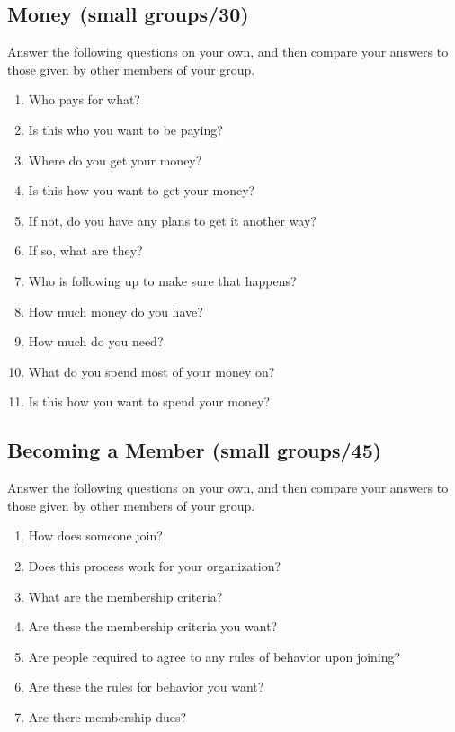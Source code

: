\subsection*{Money (small groups/30)}

Answer the following questions on your own, and then compare your
answers to those given by other members of your group.

\begin{enumerate}
\item
  Who pays for what?
\item
  Is this who you want to be paying?
\item
  Where do you get your money?
\item
  Is this how you want to get your money?
\item
  If not, do you have any plans to get it another way?
\item
  If so, what are they?
\item
  Who is following up to make sure that happens?
\item
  How much money do you have?
\item
  How much do you need?
\item
  What do you spend most of your money on?
\item
  Is this how you want to spend your money?
\end{enumerate}

\subsection*{Becoming a Member (small groups/45)}

Answer the following questions on your own, and then compare your
answers to those given by other members of your group.

\begin{enumerate}
\item
  How does someone join?
\item
  Does this process work for your organization?
\item
  What are the membership criteria?
\item
  Are these the membership criteria you want?
\item
  Are people required to agree to any rules of behavior upon joining?
\item
  Are these the rules for behavior you want?
\item
  Are there membership dues?
\end{enumerate}

